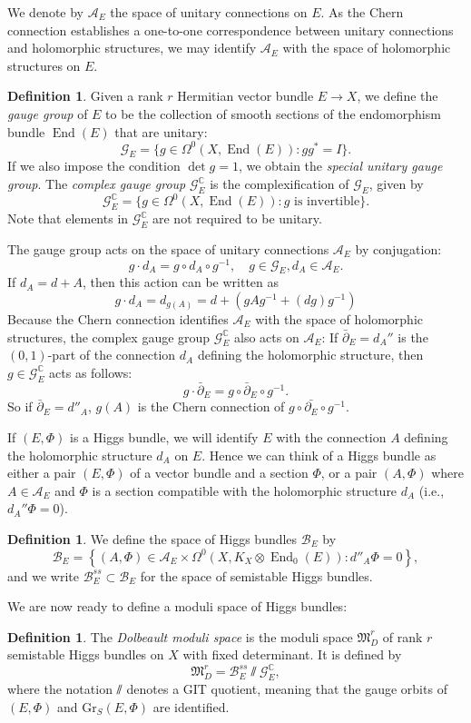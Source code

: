 \documentclass[10pt]{amsart}
\numberwithin{equation}{section}
\def\~#1{\mathscr{#1}}
\newcommand{\C}{\mathbb{C}}
\newcommand{\Gr}{\mathrm{Gr}}
\DeclareMathOperator{\End}{End}
\renewcommand{\frak}[1]{\mathfrak{#1}}
\theoremstyle{plain}
\theoremstyle{definition}
\newtheorem{defn}[thm]{Definition}
\theoremstyle{remark}
\begin{document}
We denote by $\~A_E$ the space of unitary connections on $E$. As the Chern connection establishes a one-to-one correspondence between unitary connections and holomorphic structures, we may identify $\~A_E$ with the space of holomorphic structures on $E$.

\begin{defn}
    Given a rank $r$ Hermitian vector bundle $E \to X$, we define the \emph{gauge group} of $E$ to be the collection of smooth sections of the endomorphism bundle $\End(E)$ that are unitary: 
    \[\~G_E = \{g \in \Omega^0(X, \End(E)) : gg^* = I\}.\]
    If we also impose the condition $\det g = 1$, we obtain the \emph{special unitary gauge group}. The \emph{complex gauge group} $\~G_E^\C$ is the complexification of $\~G_E$, given by
    \[\~G_E^\C = \{g \in \Omega^0(X, \End(E)) : g \text{ is invertible}\}.\]
    Note that elements in $\~G_E^\C$ are not required to be unitary.
\end{defn}

The gauge group acts on the space of unitary connections $\~A_E$ by conjugation:
\[g \cdot d_A = g \circ d_A \circ g^{-1}, \quad g \in \~G_E, d_A \in \~A_E.\]
If $d_A = d + A$, then this action can be written as
\[g \cdot d_A = d_{g(A)} = d + \left(g A g^{-1} + (dg)g^{-1}\right)\] 
Because the Chern connection identifies $\~A_E$ with the space of holomorphic structures, the complex gauge group $\~G_E^\C$ also acts on $\~A_E$: If $\bar{\partial}_E = d_A''$ is the $(0,1)$-part of the connection $d_A$ defining the holomorphic structure, then $g \in \~G_E^\C$ acts as follows:
\[g \cdot \bar{\partial}_E = g \circ \bar{\partial}_E \circ g^{-1}.\]
So if  $\bar{\partial}_E = d''_A$, $g(A)$ is the Chern connection of $g \circ \bar{\partial_E} \circ g^{-1}$. 

If $(E, \Phi)$ is a Higgs bundle, we will identify $E$ with the connection $A$ defining the holomorphic structure $d_A$ on $E$. Hence we can think of a Higgs bundle as either a pair $(E, \Phi)$ of a vector bundle and a section $\Phi$, or a pair $(A, \Phi)$ where $A \in \~A_E$ and $\Phi$ is a section compatible with the holomorphic structure $d_A$ (i.e., $d_A'' \Phi = 0$).   
\begin{defn}
    We define the space of Higgs bundles $\~B_E$ by
    \[\~B_E = \left\{(A, \Phi) \in \~A_E \times \Omega^0 \left(X, K_X \otimes \End_0(E)\right) : d''_A\Phi = 0 \right\},\]
    and we write $\~B_E^{ss} \subset \~B_E$ for the space of semistable Higgs bundles. 
\end{defn}
We are now ready to define a moduli space of Higgs bundles:
\begin{defn}
    The \emph{Dolbeault moduli space} is the moduli space $\frak{M}_D^r$ of rank $r$ semistable Higgs bundles on $X$ with fixed determinant. It is defined by
    \[\frak{M}_D^r = \~B_E^{ss}\sslash\~G_E^\C,\] where the notation $\sslash$ denotes a GIT quotient, meaning that the gauge orbits of $(E, \Phi)$ and $\Gr_S(E, \Phi)$ are identified.
\end{defn}
\end{document}
